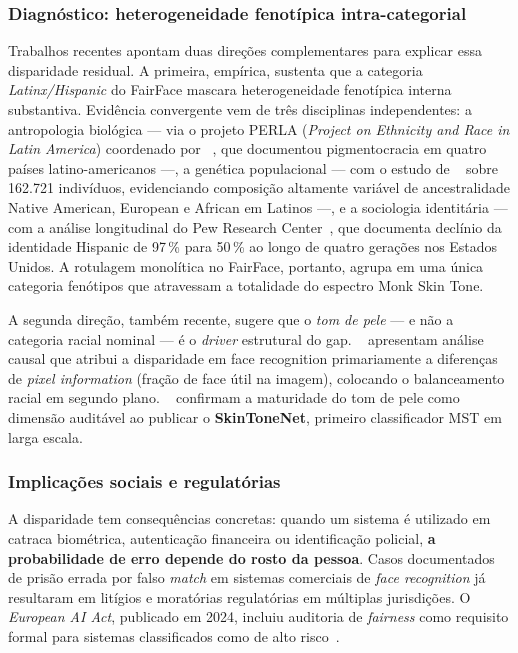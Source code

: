 \subsubsection{Diagnóstico: heterogeneidade fenotípica intra-categorial}
\label{sec:problema_heterogeneidade}

Trabalhos recentes apontam duas direções complementares para explicar essa disparidade residual. A primeira, empírica, sustenta que a categoria \emph{Latinx/Hispanic} do FairFace mascara heterogeneidade fenotípica interna substantiva. Evidência convergente vem de três disciplinas independentes: a antropologia biológica --- via o projeto PERLA (\emph{Project on Ethnicity and Race in Latin America}) coordenado por \citeauthor{telles2014pigmentocrac}~\autocite{telles2014pigmentocrac}, que documentou pigmentocracia em quatro países latino-americanos ---, a genética populacional --- com o estudo de \citeauthor{bryc2015genetic}~\autocite{bryc2015genetic} sobre 162.721 indivíduos, evidenciando composição altamente variável de ancestralidade Native American, European e African em Latinos ---, e a sociologia identitária --- com a análise longitudinal do Pew Research Center~\autocite{lopez2017hispanic}, que documenta declínio da identidade Hispanic de 97\,\% para 50\,\% ao longo de quatro gerações nos Estados Unidos. A rotulagem monolítica no FairFace, portanto, agrupa em uma única categoria fenótipos que atravessam a totalidade do espectro Monk Skin Tone.

A segunda direção, também recente, sugere que o \emph{tom de pele} --- e não a categoria racial nominal --- é o \emph{driver} estrutural do gap. \citeauthor{pangelinan2023exploring}~\autocite{pangelinan2023exploring} apresentam análise causal que atribui a disparidade em face recognition primariamente a diferenças de \emph{pixel information} (fração de face útil na imagem), colocando o balanceamento racial em segundo plano. \citeauthor{matias2026large}~\autocite{matias2026large} confirmam a maturidade do tom de pele como dimensão auditável ao publicar o \textbf{SkinToneNet}, primeiro classificador MST em larga escala.

\subsubsection{Implicações sociais e regulatórias}
\label{sec:problema_sociais}

A disparidade tem consequências concretas: quando um sistema é utilizado em catraca biométrica, autenticação financeira ou identificação policial, \textbf{a probabilidade de erro depende do rosto da pessoa}. Casos documentados de prisão errada por falso \emph{match} em sistemas comerciais de \emph{face recognition} já resultaram em litígios e moratórias regulatórias em múltiplas jurisdições. O \emph{European AI Act}, publicado em 2024, incluiu auditoria de \emph{fairness} como requisito formal para sistemas classificados como de alto risco~\autocite{lafargue2025fairness}.

